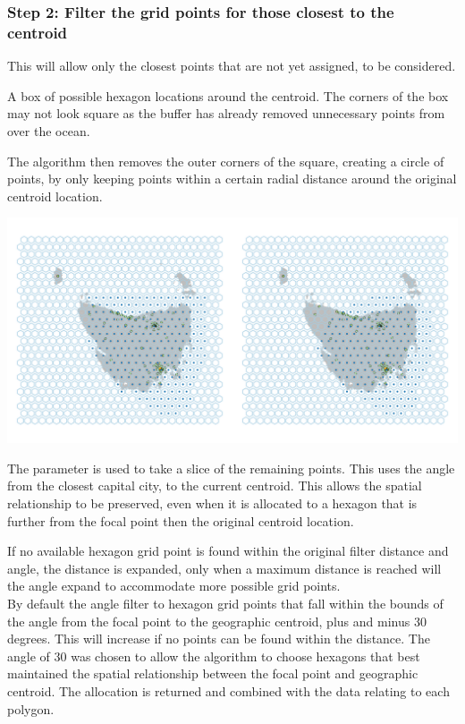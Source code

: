 \documentclass[
]{jss}
\begin{document}
\hypertarget{step-2-filter-the-grid-points-for-those-closest-to-the-centroid}{%
\subsubsection{Step 2: Filter the grid points for those closest to the
centroid}\label{step-2-filter-the-grid-points-for-those-closest-to-the-centroid}}

This will allow only the closest points that are not yet assigned, to be
considered.

A box of possible hexagon locations around the centroid. The corners of
the box may not look square as the buffer has already removed
unnecessary points from over the ocean.

The algorithm then removes the outer corners of the square, creating a
circle of points, by only keeping points within a certain radial
distance around the original centroid location.

\begin{CodeChunk}


\begin{center}\includegraphics[width=1\linewidth]{figures/4grid} \end{center}

\end{CodeChunk}

The  parameter is used to take a slice of the remaining
points. This uses the angle from the closest capital city, to the
current centroid. This allows the spatial relationship to be preserved,
even when it is allocated to a hexagon that is further from the focal
point then the original centroid location.

If no available hexagon grid point is found within the original filter
distance and angle, the distance is expanded, only when a maximum
distance is reached will the angle expand to accommodate more possible
grid points.\\
By default the angle filter to hexagon grid points that fall within the
bounds of the angle from the focal point to the geographic centroid,
plus and minus 30 degrees. This will increase if no points can be found
within the  distance. The angle of 30 was chosen to
allow the algorithm to choose hexagons that best maintained the spatial
relationship between the focal point and geographic centroid. The
allocation is returned and combined with the data relating to each
polygon.
\end{document}
